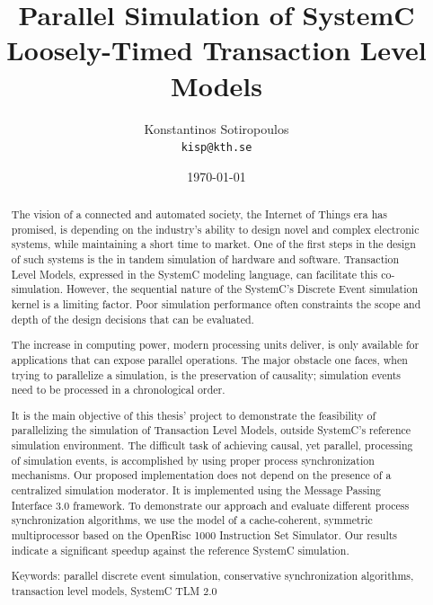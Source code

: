 \documentclass[12pt,twoside]{article}
\author{Konstantinos Sotiropoulos \\ \texttt{kisp@kth.se}}
\date{\today}
\title{Parallel Simulation of SystemC Loosely-Timed Transaction Level Models}
\begin{document}
\maketitle
\clearpage



\begin{abstract}
The vision of a connected and automated society, the Internet of Things era has promised,
is depending on the industry's ability to design novel and complex electronic systems,
while maintaining a short time to market.
One of the first steps in the design of such systems is the in tandem simulation of hardware and software.
Transaction Level Models, expressed in the SystemC modeling language, can facilitate this co-simulation.
However, the sequential nature of the SystemC's Discrete Event simulation kernel is a limiting factor.
Poor simulation performance often constraints the scope and depth of the design decisions that can be evaluated.

The increase in computing power, modern processing units deliver, is only available for applications that can expose parallel operations.
The major obstacle one faces, when trying to parallelize a simulation, is the preservation of causality; simulation events need to be processed in a chronological order.

It is the main objective of this thesis' project to demonstrate the feasibility of parallelizing the simulation of Transaction Level Models, outside SystemC's reference simulation environment.
The difficult task of achieving causal, yet parallel, processing of simulation events, is accomplished by using proper process synchronization mechanisms.
Our proposed implementation does not depend on the presence of a centralized simulation moderator. 
It is implemented using the Message Passing Interface 3.0 framework.
To demonstrate our approach and evaluate different process synchronization algorithms,
we use the model of a cache-coherent, symmetric multiprocessor based on the OpenRisc 1000 Instruction Set Simulator. Our results indicate a significant speedup against the reference SystemC simulation.

Keywords: parallel discrete event simulation, conservative synchronization algorithms, transaction level models, SystemC TLM 2.0
\end{abstract}
\clearpage




\tableofcontents
\clearpage
\end{document}

